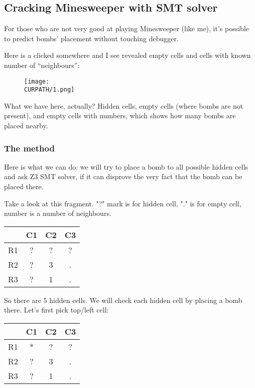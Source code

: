 \subsection{Cracking Minesweeper with SMT solver}
\label{minesweeper_SMT}

\renewcommand{\CURPATH}{equations/minesweeper_SMT}

For those who are not very good at playing Minesweeper (like me), it's possible to predict bombs' placement without touching debugger.

Here is a clicked somewhere and I see revealed empty cells and cells with known number of ``neighbours'':

\begin{figure}[H]
\centering
\texttt{[image: \\CURPATH/1.png]}
\end{figure}

What we have here, actually? Hidden cells, empty cells (where bombs are not present), and empty cells with numbers, which shows how many bombs are placed nearby.

\subsubsection{The method}

Here is what we can do: we will try to place a bomb to all possible hidden cells and ask Z3 SMT solver, if it can disprove the very fact that the bomb can be placed there.

Take a look at this fragment. "?" mark is for hidden cell, "." is for empty cell, number is a number of neighbours.

\begin{center}
\begin{tabular}{ | c | c | c | c | }
\hline
 & C1 & C2 & C3 \\
\hline
R1 & ? & ? & ? \\
\hline
R2 & ? & 3 & . \\
\hline
R3 & ? & 1 & . \\
\hline
\end{tabular}
\end{center}

So there are 5 hidden cells.
We will check each hidden cell by placing a bomb there.
Let's first pick top/left cell:

\begin{center}
\begin{tabular}{ | c | c | c | c | }
\hline
 & C1 & C2 & C3 \\
\hline
R1 & * & ? & ? \\
\hline
R2 & ? & 3 & . \\
\hline
R3 & ? & 1 & . \\
\hline
\end{tabular}
\end{center}


